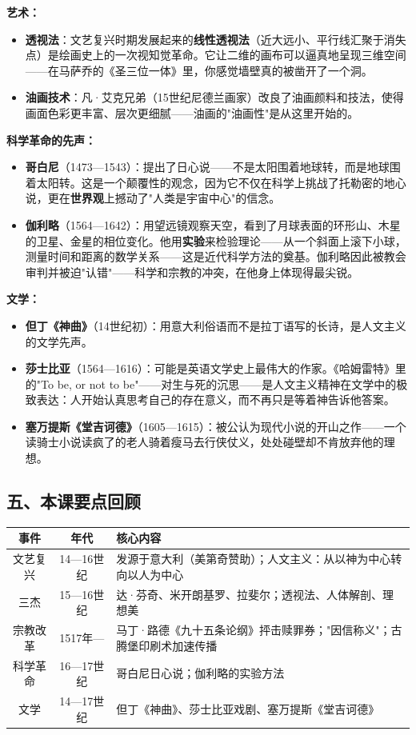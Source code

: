 \documentclass[a4paper,12pt]{ctexart}
\begin{document}
\textbf{艺术：}
\begin{itemize}
  \item \textbf{透视法}：文艺复兴时期发展起来的\textbf{线性透视法}（近大远小、平行线汇聚于消失点）是绘画史上的一次视知觉革命。它让二维的画布可以逼真地呈现三维空间——在马萨乔的《圣三位一体》里，你感觉墙壁真的被凿开了一个洞。
  \item \textbf{油画技术}：凡·艾克兄弟（15世纪尼德兰画家）改良了油画颜料和技法，使得画面色彩更丰富、层次更细腻——油画的"油画性"是从这里开始的。
\end{itemize}

\textbf{科学革命的先声：}
\begin{itemize}
  \item \textbf{哥白尼}（1473—1543）：提出了日心说——不是太阳围着地球转，而是地球围着太阳转。这是一个颠覆性的观念，因为它不仅在科学上挑战了托勒密的地心说，更在\textbf{世界观}上撼动了"人类是宇宙中心"的信念。
  \item \textbf{伽利略}（1564—1642）：用望远镜观察天空，看到了月球表面的环形山、木星的卫星、金星的相位变化。他用\textbf{实验}来检验理论——从一个斜面上滚下小球，测量时间和距离的数学关系——这是近代科学方法的奠基。伽利略因此被教会审判并被迫"认错"——科学和宗教的冲突，在他身上体现得最尖锐。
\end{itemize}

\textbf{文学：}
\begin{itemize}
  \item \textbf{但丁《神曲》}（14世纪初）：用意大利俗语而不是拉丁语写的长诗，是人文主义的文学先声。
  \item \textbf{莎士比亚}（1564—1616）：可能是英语文学史上最伟大的作家。《哈姆雷特》里的"To be, or not to be"——对生与死的沉思——是人文主义精神在文学中的极致表达：人开始认真思考自己的存在意义，而不再只是等着神告诉他答案。
  \item \textbf{塞万提斯《堂吉诃德》}（1605—1615）：被公认为现代小说的开山之作——一个读骑士小说读疯了的老人骑着瘦马去行侠仗义，处处碰壁却不肯放弃他的理想。
\end{itemize}

\subsection*{五、本课要点回顾}

\begin{center}
\begin{tabular}{|c|c|p{7cm}|}
\hline
\textbf{事件} & \textbf{年代} & \textbf{核心内容} \\
\hline
文艺复兴 & 14—16世纪 & 发源于意大利（美第奇赞助）；人文主义：从以神为中心转向以人为中心 \\
\hline
三杰 & 15—16世纪 & 达·芬奇、米开朗基罗、拉斐尔；透视法、人体解剖、理想美 \\
\hline
宗教改革 & 1517年— & 马丁·路德《九十五条论纲》抨击赎罪券；"因信称义"；古腾堡印刷术加速传播 \\
\hline
科学革命 & 16—17世纪 & 哥白尼日心说；伽利略的实验方法 \\
\hline
文学 & 14—17世纪 & 但丁《神曲》、莎士比亚戏剧、塞万提斯《堂吉诃德》 \\
\hline
\end{tabular}
\end{center}
\end{document}
